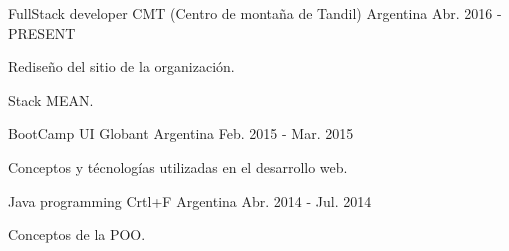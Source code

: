 


\begin{cventries}

\cventry
{FullStack developer} %
{CMT (Centro de montaña de Tandil)} %
{Argentina} %
{Abr. 2016 - PRESENT} %
{ %
\begin{cvitems}
\item {Rediseño del sitio de la organización.}
\item {Stack MEAN.}
\end{cvitems}
}




\cventry
{BootCamp UI} %
{Globant} %
{Argentina} %
{Feb. 2015 - Mar. 2015} %
{ %
\begin{cvitems}
\item {Conceptos y técnologías utilizadas en el desarrollo web.}
\end{cvitems}
}


\cventry
{Java programming} %
{Crtl+F} %
{Argentina} %
{Abr. 2014 - Jul. 2014} %
{ %
\begin{cvitems}
\item {Conceptos de la POO.}
\end{cvitems}
}


\end{cventries}
